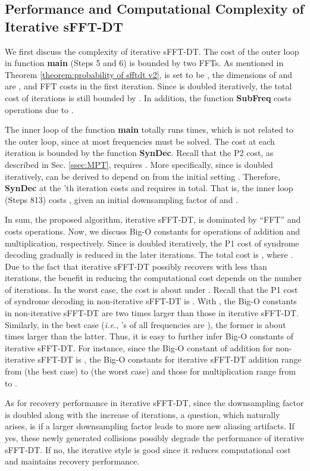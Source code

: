 \documentclass[journal,onecolumn,11pt]{IEEEtran}
\begin{document}
\subsection{Performance and Computational Complexity of Iterative sFFT-DT}\label{ssec:conv_analysis}
We first discuss the complexity of iterative sFFT-DT.
The cost of the outer loop in function \textbf{main} (Steps 5 and 6) is bounded by two FFTs.
As mentioned in Theorem \ref{theorem:probability of sfftdt v2},  is set to be , the dimensions of  and  are , and FFT costs  in the first iteration.
Since  is doubled iteratively, the total cost of   iterations is still bounded by .
In addition, the function \textbf{SubFreq} costs  operations due to .

The inner loop of the function \textbf{main} totally runs  times, which is not related to the outer loop, since at most  frequencies must be solved.
The cost at each iteration is bounded by the function \textbf{SynDec}.
Recall that the P2 cost, as described in Sec. \ref{ssec:MPT}, requires .
More specifically, since  is doubled iteratively,  can be derived to depend on  from the initial setting .
Therefore, \textbf{SynDec} at the 'th iteration costs  and requires   in total.
That is, the inner loop (Steps 813) costs , given an initial downsampling factor of  and .

In sum, the proposed algorithm, iterative sFFT-DT, is dominated by ``FFT'' and costs  operations.
Now, we discuss Big-O constants for operations of addition and multiplication, respectively.
Since  is doubled iteratively, the P1 cost of syndrome decoding gradually is reduced in the later iterations.
The total cost is , where .
Due to the fact that iterative sFFT-DT possibly recovers  with less than  iterations, the benefit in reducing the computational cost depends on the number of iterations.
In the worst case, the cost is about  under .
Recall that the P1 cost of syndrome decoding in non-iterative sFFT-DT is .
With , the Big-O constants in non-iterative sFFT-DT are two times larger than those in iterative sFFT-DT. Similarly, in the best case ({\em i.e.}, 's of all frequencies are ), the former is about  times larger than the latter. Thus, it is easy to further infer Big-O constants of iterative sFFT-DT. For instance, since the Big-O constant of addition for non-iterative sFFT-DT is , the Big-O constants for iterative sFFT-DT addition range from  (the best case) to  (the worst case) and those for multiplication range from  to .

As for recovery performance in iterative sFFT-DT, since the downsampling factor  is doubled along with the increase of iterations, a question, which naturally arises, is if a larger downsampling factor leads to more new aliasing artifacts.
If yes, these newly generated collisions possibly degrade the performance of iterative sFFT-DT.
If no, the iterative style is good since it reduces computational cost and maintains recovery performance.
\end{document}
